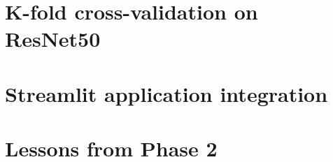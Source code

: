 \section{K-fold cross-validation on ResNet50}

%

\section{Streamlit application integration}

\section{Lessons from Phase 2}
